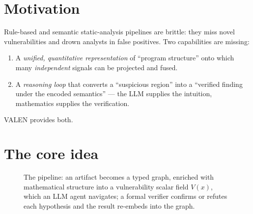 \documentclass[11pt]{article}
\begin{document}
\section{Motivation}
Rule-based and semantic static-analysis pipelines are brittle:
they miss novel vulnerabilities and drown analysts in false positives. Two
capabilities are missing:
\begin{enumerate}[label=(\arabic*)]
  \item A \emph{unified, quantitative representation} of ``program structure''
        onto which many \emph{independent} signals can be projected and fused.
  \item A \emph{reasoning loop} that converts a ``suspicious region'' into a
        ``verified finding under the encoded semantics'' --- the LLM supplies the
        intuition, mathematics supplies the verification.
\end{enumerate}
VALEN provides both.

\section{The core idea}
\begin{figure}[h]
\centering
{}
\caption{The pipeline: an artifact becomes a typed graph, enriched with
mathematical structure into a vulnerability scalar field $V(x)$, which an LLM
agent navigates; a formal verifier confirms or refutes each hypothesis and the
result re-embeds into the graph.}
\end{figure}
\end{document}

